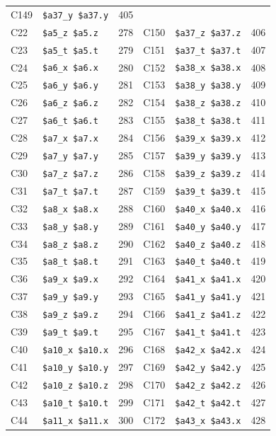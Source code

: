 \begin{table}
\begin{center}
{\begin{tabular}{|l|l|l||l|l|l|}
C149 & \verb|$a37_y $a37.y| & 405 \\
C22 & \verb|$a5_z $a5.z| & 278 &
C150 & \verb|$a37_z $a37.z| & 406 \\
C23 & \verb|$a5_t $a5.t| & 279 &
C151 & \verb|$a37_t $a37.t| & 407 \\
C24 & \verb|$a6_x $a6.x| & 280 &
C152 & \verb|$a38_x $a38.x| & 408 \\
C25 & \verb|$a6_y $a6.y| & 281 &
C153 & \verb|$a38_y $a38.y| & 409 \\
C26 & \verb|$a6_z $a6.z| & 282 &
C154 & \verb|$a38_z $a38.z| & 410 \\
C27 & \verb|$a6_t $a6.t| & 283 &
C155 & \verb|$a38_t $a38.t| & 411 \\
C28 & \verb|$a7_x $a7.x| & 284 &
C156 & \verb|$a39_x $a39.x| & 412 \\
C29 & \verb|$a7_y $a7.y| & 285 &
C157 & \verb|$a39_y $a39.y| & 413 \\
C30 & \verb|$a7_z $a7.z| & 286 &
C158 & \verb|$a39_z $a39.z| & 414 \\
C31 & \verb|$a7_t $a7.t| & 287 &
C159 & \verb|$a39_t $a39.t| & 415 \\
C32 & \verb|$a8_x $a8.x| & 288 &
C160 & \verb|$a40_x $a40.x| & 416 \\
C33 & \verb|$a8_y $a8.y| & 289 &
C161 & \verb|$a40_y $a40.y| & 417 \\
C34 & \verb|$a8_z $a8.z| & 290 &
C162 & \verb|$a40_z $a40.z| & 418 \\
C35 & \verb|$a8_t $a8.t| & 291 &
C163 & \verb|$a40_t $a40.t| & 419 \\
C36 & \verb|$a9_x $a9.x| & 292 &
C164 & \verb|$a41_x $a41.x| & 420 \\
C37 & \verb|$a9_y $a9.y| & 293 &
C165 & \verb|$a41_y $a41.y| & 421 \\
C38 & \verb|$a9_z $a9.z| & 294 &
C166 & \verb|$a41_z $a41.z| & 422 \\
C39 & \verb|$a9_t $a9.t| & 295 &
C167 & \verb|$a41_t $a41.t| & 423 \\
C40 & \verb|$a10_x $a10.x| & 296 &
C168 & \verb|$a42_x $a42.x| & 424 \\
C41 & \verb|$a10_y $a10.y| & 297 &
C169 & \verb|$a42_y $a42.y| & 425 \\
C42 & \verb|$a10_z $a10.z| & 298 &
C170 & \verb|$a42_z $a42.z| & 426 \\
C43 & \verb|$a10_t $a10.t| & 299 &
C171 & \verb|$a42_t $a42.t| & 427 \\
C44 & \verb|$a11_x $a11.x| & 300 &
C172 & \verb|$a43_x $a43.x| & 428 \\

\end{tabular}}
\end{center}
\end{table}
